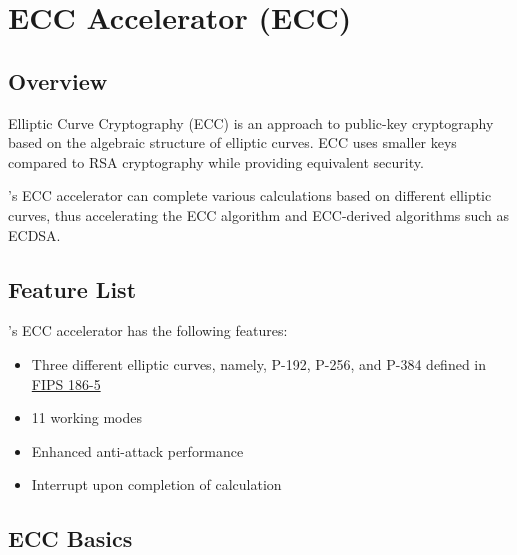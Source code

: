 \documentclass[main\_\_EN.tex]{subfiles}
\begin{document}

\ifglobal
\else
    {\let\clearpage\relax \listoftodos}
    {\let\clearpage\relax \listofdonetodos}
    \tableofcontents
\fi



\hypertarget{ecc}{}
\chapter{ECC Accelerator (ECC)}
\label{mod:ecc}

\section{Overview}

Elliptic Curve Cryptography (ECC) is an approach to public-key cryptography based on the algebraic structure of elliptic curves. ECC uses smaller keys compared to RSA cryptography while providing equivalent security.

\chipname{}'s ECC accelerator can complete various calculations based on different elliptic curves, thus accelerating the ECC algorithm and ECC-derived algorithms such as ECDSA.

\section{Feature List}

\chipname{}'s ECC accelerator has the following features:

\begin{itemize}
    \item Three different elliptic curves, namely, P-192, P-256, and P-384 defined in \href{https://nvlpubs.nist.gov/nistpubs/FIPS/NIST.FIPS.186-5.pdf}{FIPS 186-5}
    \item 11 working modes
    \item Enhanced anti-attack performance
    \item Interrupt upon completion of calculation
\end{itemize}

\section{ECC Basics}
\end{document}
